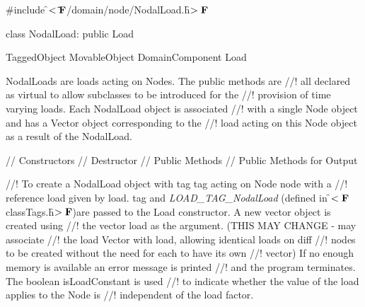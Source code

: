 
\indent \#include \f$<\tilde{ }{\bf F}$/domain/node/NodalLoad.h\f$>{\bf F}$

\indent class NodalLoad: public Load

\indent TaggedObject
\indent MovableObject
\indent\indent DomainComponent
\indent\indent\indent Load
\indent\indent\indent{}

\indent NodalLoads are loads acting on Nodes. The public methods are
//! all declared as virtual to allow subclasses to be introduced for the
//! provision of time varying loads. Each NodalLoad object is associated
//! with a single Node object and has a Vector object corresponding to the
//! load acting on this Node object as a result of the NodalLoad.

\indent\indent // Constructors
\indent{} 
\indent{}
\indent{}
\indent\indent // Destructor
\indent{}
\indent\indent // Public Methods
\indent{}
\indent{}
\indent{}
\indent\indent // Public Methods for Output
\indent{}
\indent{}
\indent{}


//! To create a NodalLoad object with tag \p tag acting on Node \p node with a
//! reference load given by \p load. \p tag and {\em LOAD\_TAG\_NodalLoad} (defined in
\f$<{\bf F}$classTags.h\f$>{\bf F}$)are passed to the Load constructor.  A new vector object is created using
//! the vector \p load as the argument. (THIS MAY CHANGE - may associate
//! the load Vector with \p load, allowing identical loads on diff
//! nodes to be created without the need for each to have its own
//! vector) If no enough memory is available an error message is printed
//! and the program terminates. The boolean \p isLoadConstant is used
//! to indicate whether the value of the load applies to the Node is
//! independent of the load factor. 

